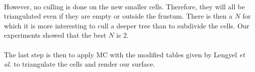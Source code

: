 \paragraph{}
However, no culling is done on the new smaller cells.
Therefore, they will all be triangulated even if they are empty or outside the frustum. 
There is then a $N$ for which it is more interesting to cull a deeper tree than to subdivide the cells. 
Our experiments showed that the best $N$ is 2.

\paragraph{}
The last step is then to apply MC with the modified tables given by Lengyel \textit{et al.} to triangulate the cells and render our surface.